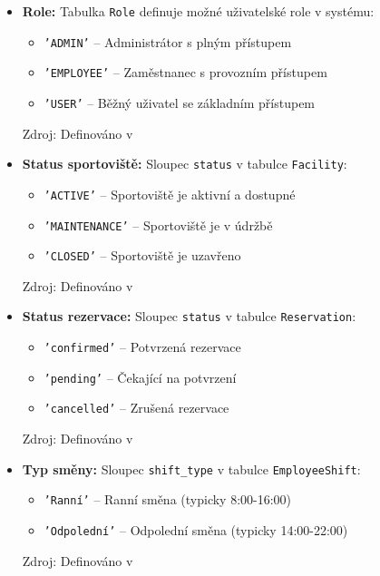 \documentclass[12pt, a4paper]{article}
\begin{document}
\begin{itemize}
    \item \textbf{Role:} Tabulka \texttt{Role} definuje možné uživatelské role v systému:
    \begin{itemize}
        \item \texttt{'ADMIN'} -- Administrátor s plným přístupem
        \item \texttt{'EMPLOYEE'} -- Zaměstnanec s provozním přístupem
        \item \texttt{'USER'} -- Běžný uživatel se základním přístupem
    \end{itemize}
    Zdroj: Definováno v 
    
    \item \textbf{Status sportoviště:} Sloupec \texttt{status} v tabulce \texttt{Facility}:
    \begin{itemize}
        \item \texttt{'ACTIVE'} -- Sportoviště je aktivní a dostupné
        \item \texttt{'MAINTENANCE'} -- Sportoviště je v údržbě
        \item \texttt{'CLOSED'} -- Sportoviště je uzavřeno
    \end{itemize}
    Zdroj: Definováno v 
    
    \item \textbf{Status rezervace:} Sloupec \texttt{status} v tabulce \texttt{Reservation}:
    \begin{itemize}
        \item \texttt{'confirmed'} -- Potvrzená rezervace
        \item \texttt{'pending'} -- Čekající na potvrzení
        \item \texttt{'cancelled'} -- Zrušená rezervace
    \end{itemize}
    Zdroj: Definováno v 
    
    \item \textbf{Typ směny:} Sloupec \texttt{shift\_type} v tabulce \texttt{EmployeeShift}:
    \begin{itemize}
        \item \texttt{'Ranní'} -- Ranní směna (typicky 8:00-16:00)
        \item \texttt{'Odpolední'} -- Odpolední směna (typicky 14:00-22:00)
    \end{itemize}
    Zdroj: Definováno v 
\end{itemize}
\end{document}
